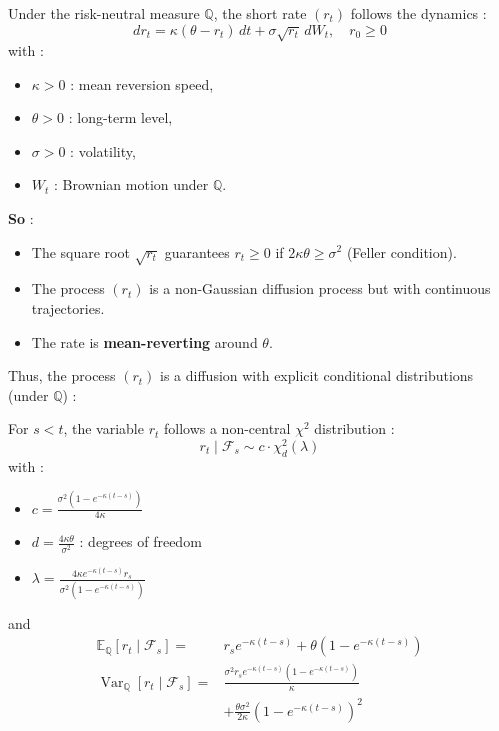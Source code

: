 \begin{f}
	
Under the risk-neutral measure \(\mathbb{Q}\), the short rate \((r_t)\) follows the dynamics :
\[
dr_t = \kappa(\theta - r_t)\,dt + \sigma \sqrt{r_t}\, dW_t, \quad r_0 \geq 0
\]
with :
\begin{itemize}[nosep]
	\item \(\kappa > 0\) : mean reversion speed,
	\item \(\theta > 0\) : long-term level,
	\item \(\sigma > 0\) : volatility,
	\item \(W_t\) : Brownian motion under \(\mathbb{Q}\).
\end{itemize}

\textbf{So} :
\begin{itemize}
	\item The square root \(\sqrt{r_t}\) guarantees \(r_t \geq 0\) if \(2\kappa\theta \geq \sigma^2\) (Feller condition).
	\item The process \((r_t)\) is a non-Gaussian diffusion process but with continuous trajectories.
	\item The rate is \textbf{mean-reverting} around \(\theta\).
\end{itemize}

Thus, the process \((r_t)\) is a diffusion with explicit conditional distributions (under \(\mathbb{Q}\)) :

For \(s < t\), the variable \(r_t\) follows a non-central \(\chi^2\) distribution :
\[
r_t \mid \mathcal{F}_s \sim c \cdot \chi^2_{d}(\lambda)
\]
with :
\begin{itemize}[nosep]
	\item \(\displaystyle c = \frac{\sigma^2 (1 - e^{-\kappa (t - s)})}{4\kappa}\)
	\item \(\displaystyle d = \frac{4\kappa\theta}{\sigma^2}\) : degrees of freedom
	\item \(\displaystyle \lambda = \frac{4\kappa e^{-\kappa (t - s)} r_s}{\sigma^2 (1 - e^{-\kappa (t - s)})}\)
\end{itemize}

and
\[
\begin{aligned}
	\mathbb{E}_\mathbb{Q}[r_t \mid \mathcal{F}_s] =& r_s e^{-\kappa(t-s)} + \theta (1 - e^{-\kappa(t-s)}) \\
	\operatorname{Var}_\mathbb{Q}[r_t \mid \mathcal{F}_s] =& \frac{\sigma^2 r_s e^{-\kappa(t-s)} (1 - e^{-\kappa(t-s)})}{\kappa} \\
			&+ \frac{\theta \sigma^2}{2\kappa} (1 - e^{-\kappa(t-s)})^2
\end{aligned}
\]

\end{f}
